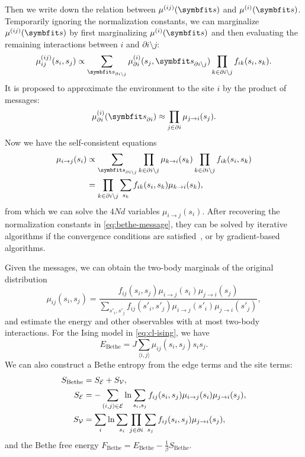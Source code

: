 Then we write down the relation between $\mu^{(i j)}(\vs)$ and $\mu^{(i)}(\vs)$. Temporarily ignoring the normalization constants, we can marginalize $\mu^{(i j)}(\vs)$ by first marginalizing $\mu^{(i)}(\vs)$ and then evaluating the remaining interactions between $i$ and $\partial i \setminus j$:
\begin{equation}
\mu^{(i j)}_{i j}(s_i, s_j) \propto \sum_{\vs_{\partial i \setminus j}} \mu^{(i)}_{\partial i}(s_j, \vs_{\partial i \setminus j}) \prod_{k \in \partial i \setminus j} f_{i k}(s_i, s_k).
\end{equation}
It is proposed to approximate the environment to the site $i$ by the product of messages:
\begin{equation}
\mu^{(i)}_{\partial i}(\vs_{\partial i}) \approx \prod_{j \in \partial i} \mu_{j \to i}(s_j).
\label{eq:bethe-prob}
\end{equation}
Now we have the self-consistent equations
\begin{align}
\mu_{i \to j}(s_i) &\propto \sum_{\vs_{\partial i \setminus j}} \prod_{k \in \partial i \setminus j} \mu_{k \to i}(s_k) \prod_{k \in \partial i \setminus j} f_{i k}(s_i, s_k) \\
&= \prod_{k \in \partial i \setminus j} \sum_{s_k} f_{i k}(s_i, s_k) \mu_{k \to i}(s_k),
\label{eq:bethe-message}
\end{align}
from which we can solve the $4 N d$ variables $\mu_{i \to j}(s_i)$. After recovering the normalization constants in \cref{eq:bethe-message}, they can be solved by iterative algorithms if the convergence conditions are satisfied~\cite{mooij2007sufficient}, or by gradient-based algorithms.

Given the messages, we can obtain the two-body marginals of the original distribution
\begin{equation}
\mu_{i j}(s_i, s_j) = \frac{f_{i j}(s_i, s_j) \mu_{i \to j}(s_i) \mu_{j \to i}(s_j)}{\sum_{s'_i, s'_j} f_{i j}(s'_i, s'_j) \mu_{i \to j}(s'_i) \mu_{j \to i}(s'_j)},
\end{equation}
and estimate the energy and other observables with at most two-body interactions. For the Ising model in \cref{eq:cl-ising}, we have
\begin{equation}
E_\text{Bethe} = J \sum_{\langle i, j \rangle} \mu_{i j}(s_i, s_j) s_i s_j.
\end{equation}
We can also construct a Bethe entropy from the edge terms and the site terms:
\begin{align}
S_\text{Bethe} &= S_{\mathcal{E}} + S_{\mathcal{V}}, \\
S_{\mathcal{E}} &= -\sum_{(i, j) \in \mathcal{E}} \ln \sum_{s_i, s_j} f_{i j}(s_i, s_j) \mu_{i \to j}(s_i) \mu_{j \to i}(s_j), \\
S_{\mathcal{V}} &= \sum_i \ln \sum_{s_i} \prod_{j \in \partial i} \sum_{s_j} f_{i j}(s_i, s_j) \mu_{j \to i}(s_j),
\end{align}
and the Bethe free energy $F_\text{Bethe} = E_\text{Bethe} - \frac{1}{\beta} S_\text{Bethe}$.

